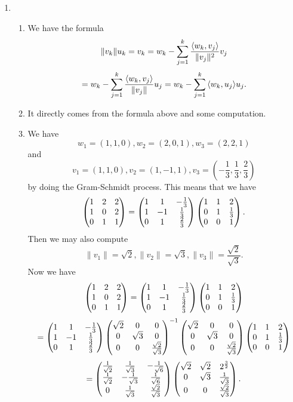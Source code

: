 \begin{enumerate}
\item \begin{enumerate}
\item We have the formula
\[\|v_k\|u_k=v_k=w_k-\sum_{j=1}^k{\frac{\langle w_k,v_j\rangle }{\|v_j\|^2}v_j}\]
\[=w_k-\sum_{j=1}^k{\frac{\langle w_k,v_j\rangle }{\|v_j\|}u_j}=w_k-\sum_{j=1}^k{\langle w_k,u_j\rangle u_j}.\]
\item It directly comes from the formula above and some computation.
\item We have 
\[w_1=(1,1,0),w_2=(2,0,1),w_3=(2,2,1)\]
and 
\[v_1=(1,1,0),v_2=(1,-1,1),v_3=(-\frac{1}{3},\frac{1}{3},\frac{2}{3})\]
by doing the Gram-Schmidt process.
This means that we have 
\[\begin{pmatrix}1 & 2 & 2\cr 1 & 0 & 2\cr 0 & 1 & 1\end{pmatrix}=\begin{pmatrix}1 & 1 & -\frac{1}{3}\cr 1 & -1 & \frac{1}{3}\cr 0 & 1 & \frac{2}{3}\end{pmatrix}\begin{pmatrix}1 & 1 & 2\cr 0 & 1 & \frac{1}{3}\cr 0 & 0 & 1\end{pmatrix}.\]
Then we may also compute 
\[\|v_1\|=\sqrt{2},\|v_2\|=\sqrt{3},\|v_3\|=\frac{\sqrt{2}}{\sqrt{3}}.\]
Now we have 
\[\begin{pmatrix}1 & 2 & 2\cr 1 & 0 & 2\cr 0 & 1 & 1\end{pmatrix}=\begin{pmatrix}1 & 1 & -\frac{1}{3}\cr 1 & -1 & \frac{1}{3}\cr 0 & 1 & \frac{2}{3}\end{pmatrix}\begin{pmatrix}1 & 1 & 2\cr 0 & 1 & \frac{1}{3}\cr 0 & 0 & 1\end{pmatrix}\]
\[=\begin{pmatrix}1 & 1 & -\frac{1}{3}\cr 1 & -1 & \frac{1}{3}\cr 0 & 1 & \frac{2}{3}\end{pmatrix}\begin{pmatrix}\sqrt{2} & 0 & 0\cr 0 & \sqrt{3} & 0\cr 0 & 0 & \frac{\sqrt{2}}{\sqrt{3}}\end{pmatrix}^{-1}\begin{pmatrix}\sqrt{2} & 0 & 0\cr 0 & \sqrt{3} & 0\cr 0 & 0 & \frac{\sqrt{2}}{\sqrt{3}}\end{pmatrix}\begin{pmatrix}1 & 1 & 2\cr 0 & 1 & \frac{1}{3}\cr 0 & 0 & 1\end{pmatrix}\]
\[=\begin{pmatrix}\frac{1}{\sqrt{2}} & \frac{1}{\sqrt{3}} & -\frac{1}{\sqrt{6}}\cr \frac{1}{\sqrt{2}} & -\frac{1}{\sqrt{3}} & \frac{1}{\sqrt{6}}\cr 0 & \frac{1}{\sqrt{3}} & \frac{\sqrt{2}}{\sqrt{3}}\end{pmatrix}\begin{pmatrix}\sqrt{2} & \sqrt{2} & {2}^{\frac{3}{2}}\cr 0 & \sqrt{3} & \frac{1}{\sqrt{3}}\cr 0 & 0 & \frac{\sqrt{2}}{\sqrt{3}}\end{pmatrix}.\]

\end{enumerate}
\end{enumerate}
